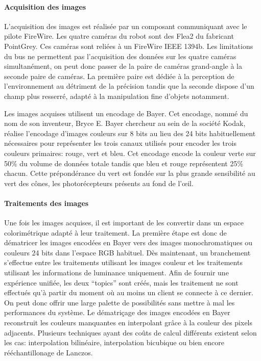 \paragraph{Acquisition des images}

L'acquisition des images est réalisée par un composant communiquant
avec le pilote FireWire. Les quatre caméras du robot sont des Flea2 du
fabricant PointGrey. Ces caméras sont reliées à un FireWire IEEE
1394b. Les limitations du bus ne permettent
pas l'acquisition des données sur les quatre caméras simultanément, on
peut donc passer de la paire de caméras grand-angle à la seconde paire
de caméras. La première paire est dédiée à la perception de
l'environnement au détriment de la précision tandis que la seconde
dispose d'un champ plus resserré, adapté à la manipulation fine
d'objets notamment.

Les images acquises utilisent un encodage de Bayer. Cet encodage, nommé du nom de son inventeur, Bryce
E. Bayer chercheur au sein de la société Kodak, réalise l'encodage
d'images couleurs sur 8 bits au lieu des 24 bits habituellement
nécessaires pour représenter les trois canaux utilisés pour encoder
les trois couleurs primaires: rouge, vert et bleu. Cet encodage encode
la couleur verte sur 50\% du volume de données totale tandis que bleu
et rouge représentent 25\% chacun. Cette prépondérance du vert est
fondée sur la plus grande sensibilité au vert des cônes, les
photorécepteurs présents au fond de l'\oe il.


\paragraph{Traitements des images}

Une fois les images acquises, il est important de les convertir dans
un espace colorimétrique adapté à leur
traitement. La première étape est donc de dématricer les images
encodées en Bayer vers des images monochromatiques ou couleurs 24 bits
dans l'espace RGB habituel. Dès maintenant, un branchement s'effectue
entre les traitements utilisant les images couleur et les traitements
utilisant les informations de luminance uniquement. Afin de fournir
une expérience unifiée, les deux ``topics'' sont créés, mais les
traitement ne sont effectués qu'à partir du moment où au moins un
client se connecte à ce dernier. On peut donc offrir une large palette
de possibilités sans mettre à mal les performances du système. Le
dématriçage des images encodées en Bayer
reconstruit les couleurs manquantes en interpolant grâce à la couleur
des pixels adjacents. Plusieurs techniques ayant des coûts de calcul
différents existent selon les cas: interpolation bilinéaire,
interpolation bicubique ou bien encore rééchantillonage de
Lanczos.


